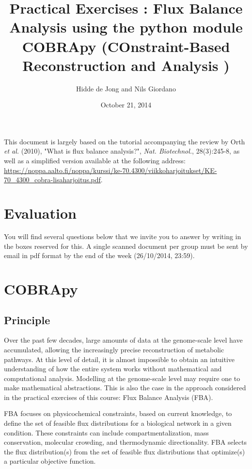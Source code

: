 \documentclass[a4paper,11pt]{exam}
\title{\bf Practical Exercises : Flux Balance Analysis using the python module COBRApy (COnstraint-Based Reconstruction and Analysis )}
\author{Hidde de Jong and Nils Giordano\\
%
}
\date{October 21, 2014}
\begin{document}
\maketitle

This document is largely based on the tutorial accompanying the review by Orth \textit{et al.} (2010), "What is flux balance analysis?", \textit{Nat. Biotechnol.}, 28(3):245-8, as well as a simplified version available at the following address:
\url{https://noppa.aalto.fi/noppa/kurssi/ke-70.4300/viikkoharjoitukset/KE-70\_4300\_cobra-lisaharjoitus.pdf}.

\section*{Evaluation}

You will find several questions below that we invite you to answer by writing in the boxes reserved for this.
A single scanned document per group must be sent by email in pdf format by the end of the week (26/10/2014, 23:59).

\section*{COBRApy}
\label{sec:COBRA}

\subsection*{Principle}

Over the past few decades, large amounts of data at the genome-scale level have accumulated, allowing the increasingly precise reconstruction of metabolic pathways.
At this level of detail, it is almost impossible to obtain an intuitive understanding of how the entire system works without mathematical and computational analysis.
Modelling at the genome-scale level may require one to make mathematical abstractions.
This is also the case in the approach considered in the practical exercises of this course: Flux Balance Analysis (FBA).

FBA focuses on physicochemical constraints, based on current knowledge, to define the set of feasible flux distributions for a biological network in a given condition.
These constraints can include compartmentalization, mass conservation, molecular crowding, and thermodynamic directionality. FBA selects the flux distribution(s) from the set of feasible flux distributions that optimize(s) a particular objective function.
\end{document}
